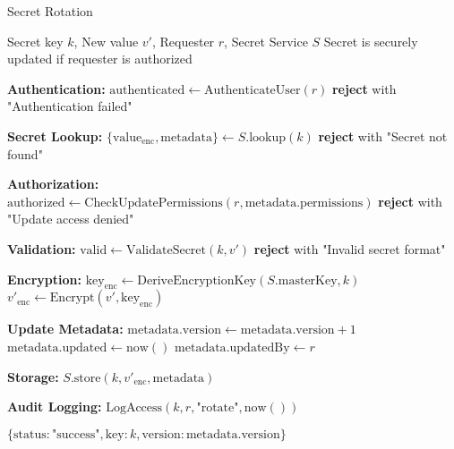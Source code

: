 \begin{tcolorbox}[
    enhanced,
    colback=blue!5!white,
    colframe=blue!75!black,
    arc=5mm,
    boxrule=1.5pt,
    title=Secret Rotation Protocol,
    fonttitle=\bfseries,
    coltitle=white,
    attach boxed title to top left={yshift=-2mm, xshift=5mm},
    boxed title style={colback=blue!75!black, rounded corners},
    shadow={2mm}{-2mm}{0mm}{black!50},
    drop fuzzy shadow
]
\begin{protocol}{Secret Rotation}
\label{prot:secret-rotation}
\begin{algorithmic}[1]
\Require Secret key $k$, New value $v'$, Requester $r$, Secret Service $S$
\Ensure Secret is securely updated if requester is authorized

\State \textbf{Authentication:}
\State $\text{authenticated} \gets \text{AuthenticateUser}(r)$
    \State \textbf{reject} with "Authentication failed"
\EndIf

\State \textbf{Secret Lookup:}
\State $\{\text{value}_{\text{enc}}, \text{metadata}\} \gets S.\text{lookup}(k)$
    \State \textbf{reject} with "Secret not found"
\EndIf

\State \textbf{Authorization:}
\State $\text{authorized} \gets \text{CheckUpdatePermissions}(r, \text{metadata}.\text{permissions})$
    \State \textbf{reject} with "Update access denied"
\EndIf

\State \textbf{Validation:}
\State $\text{valid} \gets \text{ValidateSecret}(k, v')$
    \State \textbf{reject} with "Invalid secret format"
\EndIf

\State \textbf{Encryption:}
\State $\text{key}_{\text{enc}} \gets \text{DeriveEncryptionKey}(S.\text{masterKey}, k)$
\State $v'_{\text{enc}} \gets \text{Encrypt}(v', \text{key}_{\text{enc}})$

\State \textbf{Update Metadata:}
\State $\text{metadata}.\text{version} \gets \text{metadata}.\text{version} + 1$
\State $\text{metadata}.\text{updated} \gets \text{now}()$
\State $\text{metadata}.\text{updatedBy} \gets r$

\State \textbf{Storage:}
\State $S.\text{store}(k, v'_{\text{enc}}, \text{metadata})$

\State \textbf{Audit Logging:}
\State $\text{LogAccess}(k, r, \text{"rotate"}, \text{now}())$

\State \Return $\{\text{status}: \text{"success"}, \text{key}: k, \text{version}: \text{metadata}.\text{version}\}$
\end{algorithmic}
\end{protocol}
\end{tcolorbox}
